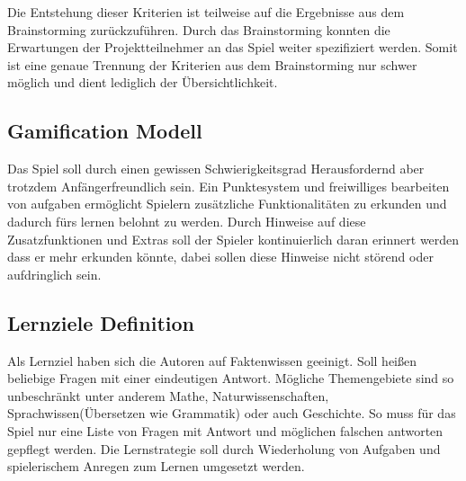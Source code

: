	Die Entstehung dieser Kriterien ist teilweise auf die Ergebnisse aus dem Brainstorming zurückzuführen. Durch das Brainstorming konnten die Erwartungen der Projektteilnehmer an das Spiel weiter spezifiziert werden. Somit ist eine genaue Trennung der Kriterien aus dem Brainstorming nur schwer möglich und dient lediglich der Übersichtlichkeit.

\subsection{Gamification Modell}\label{ssec:gamification-modell}
	Das Spiel soll durch einen gewissen Schwierigkeitsgrad Herausfordernd aber trotzdem Anfängerfreundlich sein. Ein Punktesystem und freiwilliges bearbeiten von aufgaben ermöglicht Spielern zusätzliche Funktionalitäten zu erkunden und dadurch fürs lernen belohnt zu werden.
	Durch Hinweise auf diese Zusatzfunktionen und Extras soll der Spieler kontinuierlich daran erinnert werden dass er mehr erkunden könnte, dabei sollen diese Hinweise nicht störend oder aufdringlich sein.
\subsection{Lernziele Definition}\label{ssec:lern-def}
	Als Lernziel haben sich die Autoren auf Faktenwissen geeinigt. Soll heißen beliebige Fragen mit einer eindeutigen Antwort. Mögliche Themengebiete sind so unbeschränkt unter anderem Mathe, Naturwissenschaften, Sprachwissen(Übersetzen wie Grammatik) oder auch Geschichte. So muss für das Spiel nur eine Liste von Fragen mit Antwort und möglichen falschen antworten gepflegt werden.
	Die Lernstrategie soll durch Wiederholung von Aufgaben und spielerischem Anregen zum Lernen umgesetzt werden.

